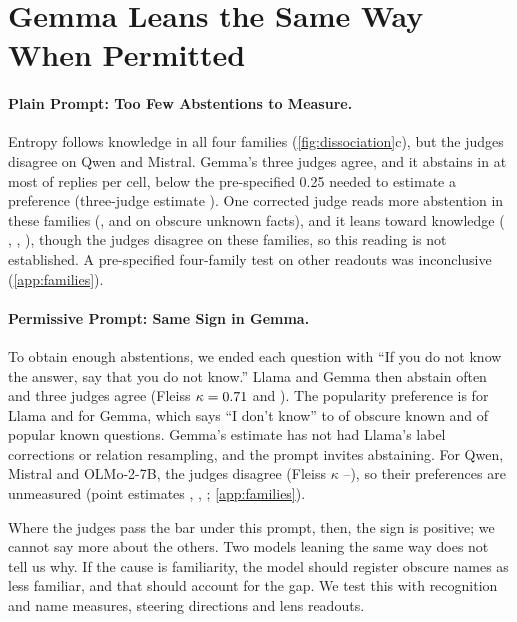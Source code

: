 \documentclass[manuscript,screen,review,anonymous,nonacm]{acmart}
\newcommand{\idk}{``I don't know''}
\begin{document}
\section{Gemma Leans the Same Way When Permitted}
\label{sec:families}

\paragraph{Plain Prompt: Too Few Abstentions to Measure.} Entropy follows knowledge in all four families (\cref{fig:dissociation}c), but the judges disagree on Qwen and Mistral. Gemma's three judges agree, and it abstains in at most \tjGemmaObsUnk{} of replies per cell, below the pre-specified 0.25 needed to estimate a preference (three-judge estimate \tjGemmaDiff{} \tjGemmaDiffCI). One corrected judge reads more abstention in these families (\mcQwenObsUnk, \mcGemmaObsUnk{} and \mcMistralObsUnk{} on obscure unknown facts), and it leans toward knowledge (\mcQwenDiff{} \mcQwenDiffCI, \mcGemmaDiff{} \mcGemmaDiffCI, \mcMistralDiff{} \mcMistralDiffCI), though the judges disagree on these families, so this reading is not established. A pre-specified four-family test on other readouts was inconclusive (\cref{app:families}).

\paragraph{Permissive Prompt: Same Sign in Gemma.} To obtain enough abstentions, we ended each question with ``If you do not know the answer, say that you do not know.'' Llama and Gemma then abstain often and three judges agree (Fleiss $\kappa=0.71$ and \pmGemmaKappa). The popularity preference is \pmLlamaDiff{} \pmLlamaDiffCI{} for Llama and \pmGemmaDiff{} \pmGemmaDiffCI{} for Gemma, which says \idk{} to \pmGemmaObsKnown{} of obscure known and \pmGemmaPopKnown{} of popular known questions. Gemma's estimate has not had Llama's label corrections or relation resampling, and the prompt invites abstaining. For Qwen, Mistral and OLMo-2-7B, the judges disagree (Fleiss $\kappa$ \pmQwenKappa--\pmMistralKappa), so their preferences are unmeasured (point estimates \pmQwenDiff, \pmMistralDiff, \pmOlmoDiff; \cref{app:families}).

Where the judges pass the bar under this prompt, then, the sign is positive; we cannot say more about the others. Two models leaning the same way does not tell us why. If the cause is familiarity, the model should register obscure names as less familiar, and that should account for the gap. We test this with recognition and name measures, steering directions and lens readouts.
\end{document}
